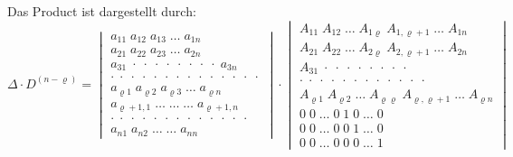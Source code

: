 Das Product ist dargestellt durch:
\[
\Delta\cdot D^{(n-\varrho)}=
\begin{vmatrix}
a_{11}\;a_{12}\;a_{13}\;\ldots\;a_{1n} \\
a_{21}\;a_{22}\;a_{23}\;\ldots\;a_{2n} \\
a_{31}\;\cdot\;\cdot\;\cdot\;\cdot\;\cdot\;\cdot\;\cdot\;\cdot\;a_{3n} \\
\cdot\;\cdot\;\cdot\;\cdot\;\cdot\;\cdot\;\cdot\;\cdot\;\cdot\;\cdot\;\cdot\;\cdot\;\cdot\;\cdot \\
a_{\varrho 1}\;a_{\varrho 2}\;a_{\varrho 3}\;\ldots\;a_{\varrho n} \\
a_{\varrho+1,1}\;\ldots\;\ldots\;\ldots\;a_{\varrho+1,n} \\
\cdot\;\cdot\;\cdot\;\cdot\;\cdot\;\cdot\;\cdot\;\cdot\;\cdot\;\cdot\;\cdot\;\cdot\;\cdot \\
a_{n1}\;a_{n2}\;\ldots\;\ldots\;a_{nn}
\end{vmatrix}
\cdot
\begin{vmatrix}
A_{11}\;A_{12}\;\ldots\;A_{1\varrho}\;A_{1,\varrho+1}\;\ldots\;A_{1n} \\
A_{21}\;A_{22}\;\ldots\;A_{2\varrho}\;A_{2,\varrho+1}\;\ldots\;A_{2n} \\
A_{31}\;\cdot\;\cdot\;\cdot\;\cdot\;\cdot\;\cdot\;\cdot\;\cdot \\
\cdot\;\cdot\;\cdot\;\cdot\;\cdot\;\cdot\;\cdot\;\cdot\;\cdot\;\cdot\;\cdot\;\cdot \\
A_{\varrho 1}\;A_{\varrho 2}\;\ldots\;A_{\varrho\varrho}\;A_{\varrho,\varrho+1}\;\ldots\;A_{\varrho n} \\
0\;0\;\ldots\;0\;1\;0\;\ldots\;0 \\
0\;0\;\ldots\;0\;0\;1\;\ldots\;0 \\
0\;0\;\ldots\;0\;0\;0\;\ldots\;1
\end{vmatrix}
\]
